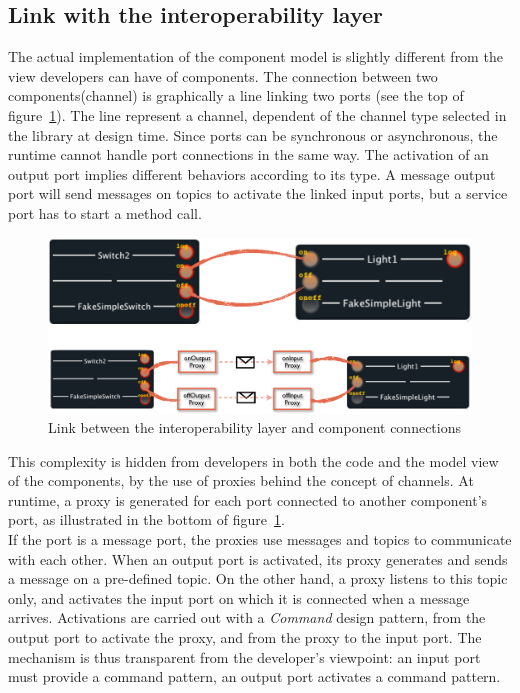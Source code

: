 \subsection{Link with the interoperability layer}
\label{subsec:compModLinkWithInterop}
The actual implementation of the component model is slightly different from the view developers can have of components. The connection between two components(channel) is graphically a line linking two ports (see the top of figure~\ref{fig:linkWithInteropLayer}). The line represent a channel, dependent of the channel type selected in the library at design time. Since ports can be synchronous or asynchronous, the runtime cannot handle port connections in the same way. The activation of an output port implies different behaviors according to its type. A message output port will send messages on topics to activate the linked input ports, but a service port has to start a method call.\\

\begin{figure}[h!]
\includegraphics[width=\textwidth]{part2/pics/InteropModelLink}
\caption{Link between the interoperability layer and component connections}
\label{fig:linkWithInteropLayer}
\end{figure}

This complexity is hidden from developers in both the code and the model view of the components, by the use of proxies behind the concept of channels. At runtime, a proxy is generated for each port connected to another component's port, as illustrated in the bottom of figure~\ref{fig:linkWithInteropLayer}.\\
If the port is a message port, the proxies use messages and topics to communicate with each other. When an output port is activated, its proxy generates and sends a message on a pre-defined topic. On the other hand, a proxy listens to this topic only, and activates the input port on which it is connected when a message arrives. Activations are carried out with a {\it Command} design pattern, from the output port to activate the proxy, and from the proxy to the input port. The mechanism is thus transparent from the developer's viewpoint: an input port must provide a command pattern, an output port activates a command pattern.\\

